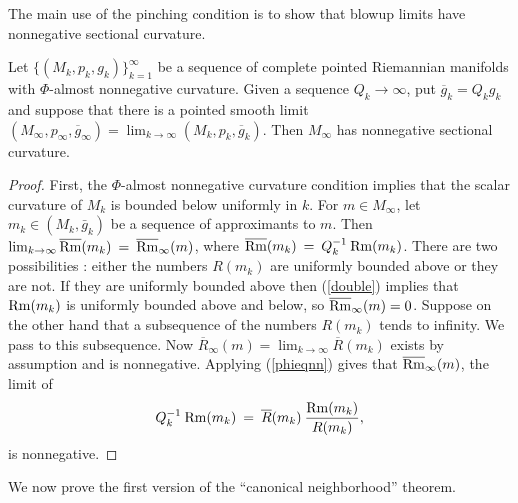 The main use of the pinching condition is to show that
blowup limits have nonnegative sectional curvature.

\begin{lemma}
  \label{lem:kl-canonical-neighborhood-theorem-convergence-canonical-neighborhoods}
 \label{almost nonneg}
Let $\{(M_k, p_k, {g}_k)\}_{k=1}^\infty$ be a sequence of
complete pointed Riemannian manifolds with $\Phi$-almost
nonnegative curvature.
Given a sequence $Q_k \rightarrow \infty$, put
$\overline{g}_k = Q_k g_k$ and
suppose that there
is a pointed smooth limit
$(M_\infty, p_\infty, \overline{g}_\infty) = \lim_{k \rightarrow \infty}
(M_k, p_k, \overline{g}_k)$. Then
$M_\infty$ has nonnegative sectional curvature.
\end{lemma}
\begin{proof}
First, the $\Phi$-almost
nonnegative curvature condition implies that the scalar
curvature of $M_k$ is bounded below uniformly in $k$.
For $m \in M_\infty$, let $m_k \in (M_k,\bar g_k)$ be
a sequence of approximants to $m$.  Then
$\lim_{k \rightarrow \infty} \overline{\operatorname{Rm}}(m_k) \: = \:
\overline{\operatorname{Rm}}_\infty(m)$, where $\overline{\operatorname{Rm}}(m_k) \: = \:
Q_k^{-1} \: {\operatorname{Rm}}(m_k)$.
There are two possibilities : either the numbers $R(m_k)$ are
uniformly bounded above or they are not.  If they are uniformly
bounded above then (\ref{double}) implies that
$\operatorname{Rm}(m_k)$ is uniformly bounded above and below,
so $\overline{\operatorname{Rm}}_\infty(m)
= 0$. Suppose on the other hand that a subsequence of the numbers
$R(m_k)$ tends to infinity.  We pass to this subsequence. Now
$\overline{R}_\infty(m) = \lim_{k \rightarrow \infty} \overline{R}(m_k)$
exists by assumption and is nonnegative.
Applying (\ref{phieqnn})
gives that $\overline{\operatorname{Rm}}_\infty(m)$, the limit of
\begin{equation}
Q_k^{-1} \: {\operatorname{Rm}}(m_k) \: = \:
\overline{R}(m_k) \: \frac{{\operatorname{Rm}}(m_k)}{R(m_k)},
\end{equation}
is nonnegative.
\end{proof}

We now prove the first version of the ``canonical neighborhood''
theorem.

